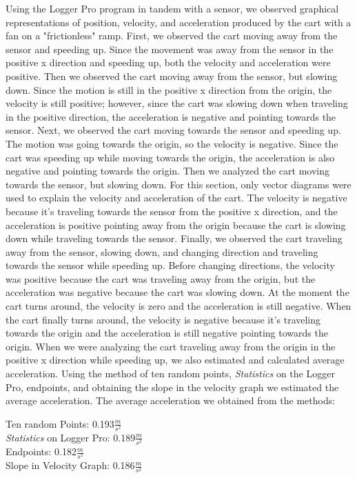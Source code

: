 \documentclass[aps,letterpaper,11pt]{revtex4}
\begin{document}
Using the Logger Pro program in tandem with a sensor, we observed graphical representations of position, velocity, and acceleration produced by the cart with a fan on a "frictionless" ramp. First, we observed the cart moving away from the sensor and speeding up. Since the movement was away from the sensor in the positive x direction and speeding up, both the velocity and acceleration were positive. Then we observed the cart moving away from the sensor, but slowing down. Since the motion is still in the positive x direction from the origin, the velocity is still positive; however, since the cart was slowing down when traveling in the positive direction, the acceleration is negative and pointing towards the sensor. Next, we observed the cart moving towards the sensor and speeding up. The motion was going towards the origin, so the velocity is negative. Since the cart was speeding up while moving towards the origin, the acceleration is also negative and pointing towards the origin. Then we analyzed the cart moving towards the sensor, but slowing down. For this section, only vector diagrams were used to explain the velocity and acceleration of the cart. The velocity is negative because it's traveling towards the sensor from the positive x direction, and the acceleration is positive pointing away from the origin because the cart is slowing down while traveling towards the sensor. Finally, we observed the cart traveling away from the sensor, slowing down, and changing direction and traveling towards the sensor while speeding up. Before changing directions, the velocity was positive because the cart was traveling away from the origin, but the acceleration was negative because the cart was slowing down. At the moment the cart turns around, the velocity is zero and the acceleration is still negative. When the cart finally turns around, the velocity is negative because it's traveling towards the origin and the acceleration is still negative pointing towards the origin. When we were analyzing the cart traveling away from the origin in the positive x direction while speeding up, we also estimated and calculated average acceleration. Using the method of ten random points, \textit{Statistics} on the Logger Pro, endpoints, and obtaining the slope in the velocity graph we estimated the average acceleration. The average acceleration we obtained from the methods:

\begin{center}
Ten random Points: 0.193$\frac{m}{s^2}$\\
\textit{Statistics} on Logger Pro: 0.189$\frac{m}{s^2}$\\
Endpoints: 0.182$\frac{m}{s^2}$\\
Slope in Velocity Graph: 0.186$\frac{m}{s^2}$
\end{center}  
\end{document}
